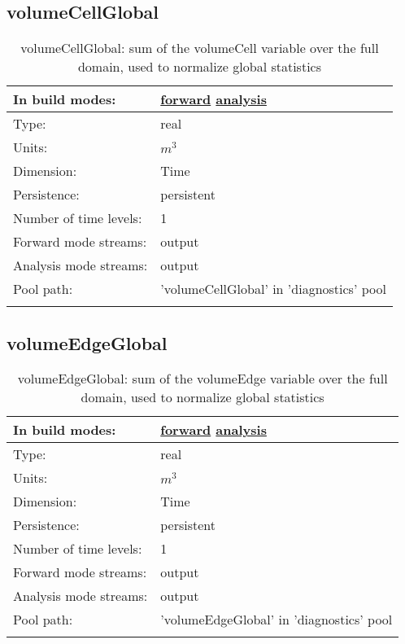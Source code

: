 \subsection[volumeCellGlobal]{volumeCellGlobal}
\label{subsec:var_sec_diagnostics_volumeCellGlobal}
\begin{center}
\begin{longtable}{| p{2.0in} | p{4.0in} |}
        \hline 
        In build modes: & \hyperref[subsec:forward_var_tab_diagnostics]{forward} \hyperref[subsec:analysis_var_tab_diagnostics]{analysis} \\
        \hline 
        Type: & real \\
        \hline 
        Units: & $m^3$ \\
        \hline 
        Dimension: & Time \\
        \hline 
        Persistence: & persistent \\
        \hline 
        Number of time levels: & 1 \\
        \hline 
		 Forward mode streams: &  output \\
        \hline 
		 Analysis mode streams: &  output \\
        \hline 
            Pool path: & 'volumeCellGlobal' in 'diagnostics' pool
 \\
		 \hline 
    \caption{volumeCellGlobal: sum of the volumeCell variable over the full domain, used to normalize global statistics}
\end{longtable}
\end{center}
\subsection[volumeEdgeGlobal]{volumeEdgeGlobal}
\label{subsec:var_sec_diagnostics_volumeEdgeGlobal}
\begin{center}
\begin{longtable}{| p{2.0in} | p{4.0in} |}
        \hline 
        In build modes: & \hyperref[subsec:forward_var_tab_diagnostics]{forward} \hyperref[subsec:analysis_var_tab_diagnostics]{analysis} \\
        \hline 
        Type: & real \\
        \hline 
        Units: & $m^3$ \\
        \hline 
        Dimension: & Time \\
        \hline 
        Persistence: & persistent \\
        \hline 
        Number of time levels: & 1 \\
        \hline 
		 Forward mode streams: &  output \\
        \hline 
		 Analysis mode streams: &  output \\
        \hline 
            Pool path: & 'volumeEdgeGlobal' in 'diagnostics' pool
 \\
		 \hline 
    \caption{volumeEdgeGlobal: sum of the volumeEdge variable over the full domain, used to normalize global statistics}
\end{longtable}
\end{center}
